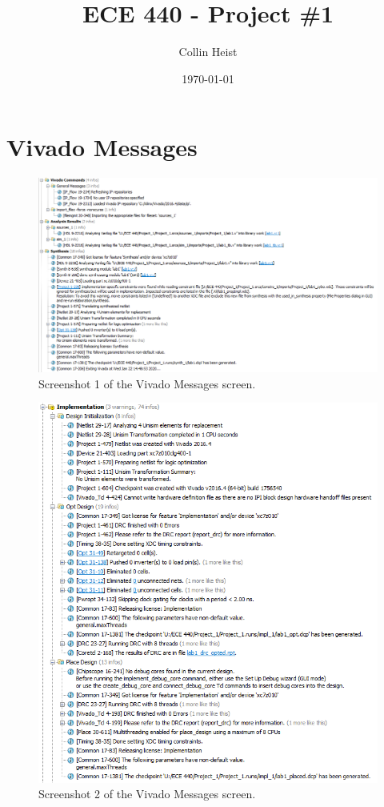 \documentclass[a4paper, 12pt]{article}
\begin{document}
\title{ECE 440 - Project \#1}
\author{Collin Heist}
\date{\today}
\maketitle
{}

\section{Vivado Messages}
\begin{figure}[H]
\centering
\includegraphics[width=1\textwidth]{vivado_messages1.PNG}
\caption{Screenshot 1 of the Vivado Messages screen.}
\label{fig:img00}
\end{figure}

\begin{figure}[H]
\centering
\includegraphics[width=1\textwidth]{vivado_messages2.PNG}
\caption{Screenshot 2 of the Vivado Messages screen.}
\label{fig:img00}
\end{figure}
\end{document}
